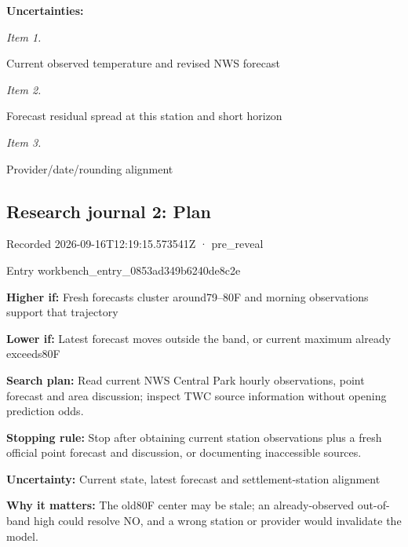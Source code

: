 \documentclass[11pt]{article}
\begin{document}
\par\noindent\textbf{Uncertainties:} \par \par\noindent\textit{Item 1.}\par Current observed temperature and revised NWS forecast

\par\noindent\textit{Item 2.}\par Forecast residual spread at this station and short horizon

\par\noindent\textit{Item 3.}\par Provider/date/rounding alignment

\subsection*{\textcolor{epdarkgreen}{Research journal 2: Plan}}
Recorded 2026-09-16T12:19:15.573541Z · pre\_reveal


Entry workbench\_en\hspace{0pt}try\_0853ad34\hspace{0pt}9b6240de8c2e


\par\noindent\textbf{Higher if:} Fresh forecasts cluster around79–80F and morning observations support that trajectory

\par\noindent\textbf{Lower if:} Latest forecast moves outside the band, or current maximum already exceeds80F

\par\noindent\textbf{Search plan:} Read current NWS Central Park hourly observations, point forecast and area discussion; inspect TWC source information without opening prediction odds.

\par\noindent\textbf{Stopping rule:} Stop after obtaining current station observations plus a fresh official point forecast and discussion, or documenting inaccessible sources.

\par\noindent\textbf{Uncertainty:} Current state, latest forecast and settlement-station alignment

\par\noindent\textbf{Why it matters:} The old80F center may be stale; an already-observed out-of-band high could resolve NO, and a wrong station or provider would invalidate the model.
\end{document}
